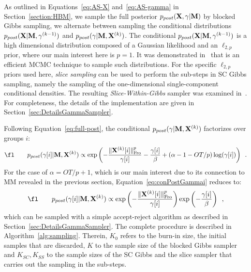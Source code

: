 As outlined in Equations~\eqref{eq:AS-X} and~\eqref{eq:AS-gamma} in Section~\ref{section:HBM}, we sample the full posterior $p_{post}(\mathbf{X},\gamma|\mathbf{M})$ by blocked Gibbs sampling, \ie we alternate between sampling the conditional distributions $p_{post}(\mathbf{X}|\mathbf{M},\mathbf{\gamma}^{(k-1)})$ and $p_{post}(\mathbf{\gamma}|\mathbf{M},\mathbf{X}^{(k)})$. The conditional $p_{post}(\mathbf{X}|\mathbf{M},\mathbf{\gamma}^{(k-1)})$ is a high dimensional distribution composed of a Gaussian likelihood and an $\ell_{2,p}$ prior, where our main interest here is $p = 1$. It was demonstrated in~\cite{Lu12} that  is an efficient MCMC technique to sample such distributions. For the specific $\ell_{2,p}$ priors used here, \emph{slice sampling} can be used to perform the sub-steps in SC Gibbs sampling, namely the sampling of the one-dimensional single-component conditional densities. The resulting \emph{Slice-Within-Gibbs} sampler was examined in~\cite{Lu16}. For completeness, the details of the implementation are given in Section~\ref{sec:DetailsGammaSampler}.

Following Equation~\eqref{eq:full-post}, the conditional $p_{post}(\mathbf{\gamma}|\mathbf{M},\mathbf{X}^{(k)})$ factorizes over groups $i$:
\begin{equation}
\fl \qquad p_{post}(\mathbf{\gamma}[i]|\bfM,\bfX^{(k)}) \propto \exp \left( -\frac{\fronorm{\bfX^{(k)}[i]}^p}{\mathbf{\gamma}[i]} - \frac{\mathbf{\gamma}[i]}{\beta} + (\alpha - 1 - O T/p) \log(\mathbf{\gamma}[i]) \right) \enspace. \label{eq:conPostGammai}
\end{equation}
For the case of $\alpha = O T/p + 1$, which is our main interest due to its connection to MM revealed in the previous section, Equation~\eqref{eq:conPostGammai} reduces to:
\begin{equation}
\fl \qquad p_{post}(\mathbf{\gamma}[i] |\bfM, \bfX^{(k)}) \propto \exp \left(- \frac{\fronorm{\bfX^{(k)}[i]}^p}{\mathbf{\gamma}[i]} \right) \exp \left(- \frac{\mathbf{\gamma}[i]}{\beta} \right) \enspace, \label{eq:conPostGammaiRed}
\end{equation}
which can be sampled with a simple accept-reject algorithm as described in Section~\ref{sec:DetailsGammaSampler}. The complete procedure is described in Algorithm~\ref{alg:sampling}. Therein, $K_0$ refers to the burn-in size, \ie the initial samples that are discarded, $K$ to the sample size of the blocked Gibbs sampler and $K_{SC}, K_{SS}$ to the sample sizes of the SC Gibbs and the slice sampler that carries out the sampling in the sub-steps.

